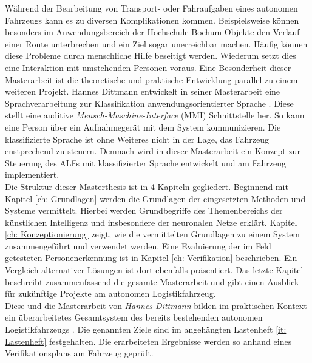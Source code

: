 		Während der Bearbeitung von Transport- oder Fahraufgaben eines autonomen Fahrzeugs kann es zu diversen Komplikationen kommen. Beispielsweise können besonders im Anwendungsbereich der Hochschule Bochum Objekte den Verlauf einer Route unterbrechen und ein Ziel sogar unerreichbar machen. Häufig können diese Probleme durch menschliche Hilfe beseitigt werden. Wiederum setzt dies eine Interaktion mit umstehenden Personen voraus. Eine Besonderheit dieser Masterarbeit ist die theoretische und praktische Entwicklung parallel zu einem weiteren Projekt. Hannes Dittmann entwickelt in seiner Masterarbeit eine Sprachverarbeitung zur Klassifikation anwendungsorientierter Sprache \cite{Dittmann}. Diese stellt eine auditive \textit{Mensch-Maschine-Interface} (MMI) Schnittstelle her. So kann eine Person über ein Aufnahmegerät mit dem System kommunizieren. Die klassifizierte Sprache ist ohne Weiteres nicht in der Lage, das Fahrzeug enstprechend zu steuern. Demnach wird in dieser Masterarbeit ein Konzept zur Steuerung des ALFs mit klassifizierter Sprache entwickelt und am Fahrzeug implementiert.\\
		
		Die Struktur dieser Masterthesis ist in 4 Kapiteln gegliedert. Beginnend mit Kapitel \ref{ch: Grundlagen} werden die Grundlagen der eingesetzten Methoden und Systeme vermittelt. Hierbei werden Grundbegriffe des Themenbereichs der künstlichen Intelligenz und insbesondere der neuronalen Netze erklärt. Kapitel \ref{ch: Konzeptionierung} zeigt, wie die vermittelten Grundlagen zu einem System zusammengeführt und verwendet werden. Eine Evaluierung der im Feld getesteten Personenerkennung ist in Kapitel \ref{ch: Verifikation} beschrieben. Ein Vergleich alternativer Lösungen ist dort ebenfalls präsentiert. Das letzte Kapitel beschreibt zusammenfassend die gesamte Masterarbeit und gibt einen Ausblick für zukünftige Projekte am autonomen Logistikfahrzeug. \\
		
		Diese und die Masterarbeit von \textit{Hannes Dittmann} bilden im praktischen Kontext ein überarbeitetes Gesamtsystem des bereits bestehenden autonomen Logistikfahrzeugs \cite{Dittmann}. Die genannten Ziele sind im angehängten Lastenheft \ref{it: Lastenheft} festgehalten. Die erarbeiteten Ergebnisse werden so anhand eines Verifikationsplans am Fahrzeug geprüft.
		
		
		
		
	